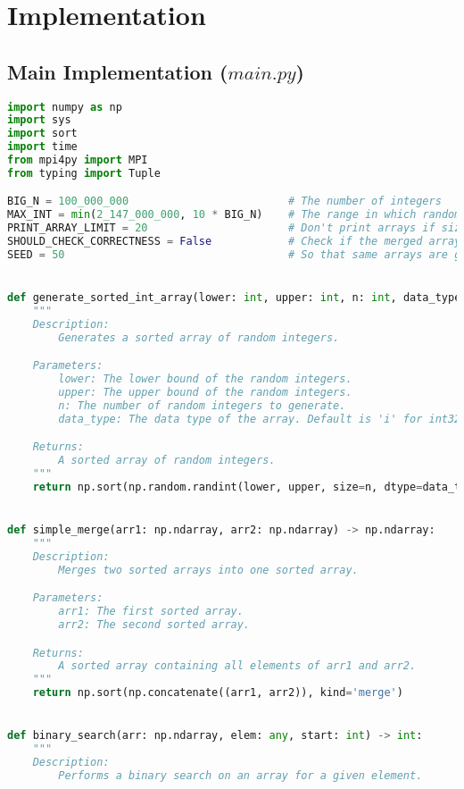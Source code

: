 \documentclass[12pt]{article}
\begin{document}
{    %
    \newpage
    \section {Implementation}
    \subsection{Main Implementation ($main.py$)}
    \begin{lstlisting}[language={Python}]
import numpy as np
import sys
import sort
import time
from mpi4py import MPI
from typing import Tuple

BIG_N = 100_000_000                         # The number of integers
MAX_INT = min(2_147_000_000, 10 * BIG_N)    # The range in which random ints are generated
PRINT_ARRAY_LIMIT = 20                      # Don't print arrays if size exceeds this value
SHOULD_CHECK_CORRECTNESS = False            # Check if the merged array is sorted - quite slow for large values of N
SEED = 50                                   # So that same arrays are generated each run for consistent tests 


def generate_sorted_int_array(lower: int, upper: int, n: int, data_type: str ='i') -> np.ndarray:
    """
    Description:
        Generates a sorted array of random integers.

    Parameters:
        lower: The lower bound of the random integers.
        upper: The upper bound of the random integers.
        n: The number of random integers to generate.
        data_type: The data type of the array. Default is 'i' for int32.

    Returns:
        A sorted array of random integers.
    """
    return np.sort(np.random.randint(lower, upper, size=n, dtype=data_type))


def simple_merge(arr1: np.ndarray, arr2: np.ndarray) -> np.ndarray:
    """
    Description:
        Merges two sorted arrays into one sorted array.

    Parameters:
        arr1: The first sorted array.
        arr2: The second sorted array.

    Returns:
        A sorted array containing all elements of arr1 and arr2.
    """
    return np.sort(np.concatenate((arr1, arr2)), kind='merge')


def binary_search(arr: np.ndarray, elem: any, start: int) -> int:
    """
    Description:
        Performs a binary search on an array for a given element.


\end{lstlisting}}
\end{document}
